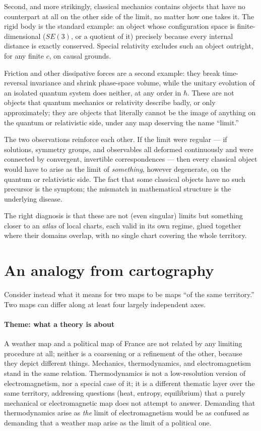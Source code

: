 Second, and more strikingly, classical mechanics contains objects that have no
counterpart at all on the other side of the limit, no matter how one takes it.
The rigid body is the standard example: an object whose configuration space is
finite-dimensional ($SE(3)$, or a quotient of it) precisely because every
internal distance is exactly conserved. Special relativity excludes such an
object outright, for any finite $c$, on causal grounds.

Friction and other dissipative forces are a second example: they break
time-reversal invariance and shrink phase-space volume, while the unitary
evolution of an isolated quantum system does neither, at any order in $\hbar$.
 These are not objects that quantum mechanics or
relativity describe badly, or only approximately; they are objects that
literally cannot be the image of anything on the quantum or relativistic side,
under any map deserving the name ``limit.''

The two observations reinforce each other. If the limit were regular --- if
solutions, symmetry groups, and observables all deformed continuously and were
connected by convergent, invertible correspondences --- then every classical
object would have to arise as the limit of \emph{something}, however
degenerate, on the quantum or relativistic side. The fact that some classical
objects have no such precursor is the symptom; the mismatch in mathematical
structure is the underlying disease. 

The right diagnosis is
that these are not (even singular) limits 
but something closer to an \emph{atlas} of local charts, each
valid in its own regime, glued together where their domains overlap, with no
single chart covering the whole territory.

\section{An analogy from cartography}
\label{lm:ca}

Consider instead what it means for two maps to be maps ``of the same territory.''
Two maps can differ along at least four largely independent axes.

\paragraph{Theme: what a theory is about}

A weather map and a political map of France are not related by any limiting
procedure at all; neither is a coarsening or a refinement of the other, because
they depict different things. Mechanics, thermodynamics, and electromagnetism
stand in the same relation. Thermodynamics is not a low-resolution version of
electromagnetism, nor a special case of it; it is a different thematic layer
over the same territory, addressing questions (heat, entropy, equilibrium) that
a purely mechanical or electromagnetic map does not attempt to answer.
Demanding that thermodynamics arise as \emph{the} limit of electromagnetism
would be as confused as demanding that a weather map arise as the limit of a
political one.


